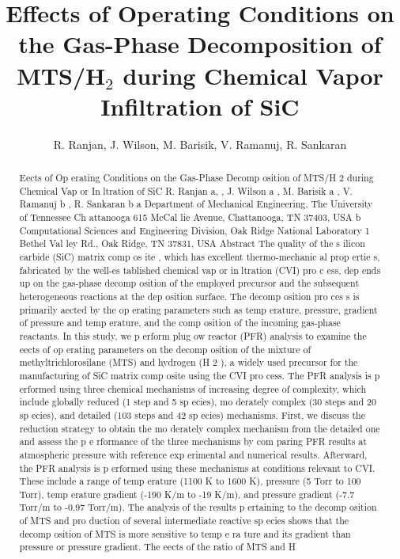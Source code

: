 \documentclass[12pt]{article}
\title{Effects of Operating Conditions on the Gas-Phase Decomposition of MTS/H$_2$ during Chemical Vapor Infiltration of SiC}
\author{R. Ranjan, J. Wilson, M. Barisik, V. Ramanuj, R. Sankaran}
\date{}
\begin{document}
\maketitle
\begin{abstract}
Eects of Op erating Conditions on the Gas-Phase Decomp osition of
MTS/H
2
during Chemical Vap or Inltration of SiC
R. Ranjan
a,
, J. Wilson
a
, M. Barisik
a
, V. Ramanuj
b
, R. Sankaran
b
a
Department of Mechanical Engineering, The University of Tennessee Ch attanooga
615 McCal lie Avenue, Chattanooga, TN 37403, USA
b
Computational Sciences and Engineering Division, Oak Ridge National Laboratory
1 Bethel Val ley Rd., Oak Ridge, TN 37831, USA
Abstract
The quality of the s ilicon carbide (SiC) matrix comp os ite , which has excellent thermo-mechanic al prop ertie s,
fabricated by the well-es tablished chemical vap or inltration (CVI) pro c ess, dep ends up on the gas-phase
decomp osition of the employed precursor and the subsequent heterogeneous reactions at the dep osition
surface. The decomp osition pro ces s is primarily aected by the op erating parameters such as temp erature,
pressure, gradient of pressure and temp erature, and the comp osition of the incoming gas-phase reactants. In
this study, we p erform plug 
ow reactor (PFR) analysis to examine the eects of op erating parameters on the
decomp osition of the mixture of methyltrichlorosilane (MTS) and hydrogen (H
2
), a widely used precursor
for the manufacturing of SiC matrix comp osite using the CVI pro cess. The PFR analysis is p erformed using
three chemical mechanisms of increasing degree of complexity, which include globally reduced (1 step and 5
sp ecies), mo derately complex (30 steps and 20 sp ecies), and detailed (103 steps and 42 sp ecies) mechanisms.
First, we discuss the reduction strategy to obtain the mo derately complex mechanism from the detailed
one and assess the p e rformance of the three mechanisms by com paring PFR results at atmospheric pressure
with reference exp erimental and numerical results. Afterward, the PFR analysis is p erformed using these
mechanisms at conditions relevant to CVI. These include a range of temp erature (1100 K to 1600 K), pressure
(5 Torr to 100 Torr), temp erature gradient (-190 K/m to -19 K/m), and pressure gradient (-7.7 Torr/m to
-0.97 Torr/m). The analysis of the results p ertaining to the decomp osition of MTS and pro duction of several
intermediate reactive sp ecies shows that the decomp osition of MTS is more sensitive to temp e ra ture and
its gradient than pressure or pressure gradient. The eects of the ratio of MTS and H

\end{abstract}
\end{document}
